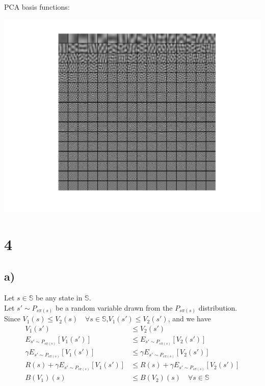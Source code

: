\documentclass[11pt]{article}
\begin{document}
PCA basis functions:

\includegraphics[width=\textwidth]{q3/pca_filters.png}

\section*{4}
\subsection*{a)}
Let $s \in \mathbb{S}$ be any state in $\mathbb{S}$.\\
Let $s' \sim P_{s \pi(s)}$ be a random variable drawn from the $P_{s \pi(s)}$ distribution.\\
Since $V_1(s) \le V_2(s) \quad \forall s \in \mathbb{S}$,\quad$V_1(s') \le V_2(s')$, and we have
\begin{align*}
    V_1(s') &\le V_2(s') \\
    E_{s' \sim P_{s \pi(s)}}[V_1(s')] &\le E_{s' \sim P_{s \pi(s)}}[V_2(s')] \\
    \gamma E_{s' \sim P_{s \pi(s)}}[V_1(s')] &\le \gamma E_{s' \sim P_{s \pi(s)}}[V_2(s')] \\
    R(s) + \gamma E_{s' \sim P_{s \pi(s)}}[V_1(s')] &\le R(s) + \gamma E_{s' \sim P_{s \pi(s)}}[V_2(s')] \\
    B(V_1)(s) &\le B(V_2)(s) \quad \forall s \in \mathbb{S} \\
\end{align*}
\end{document}
